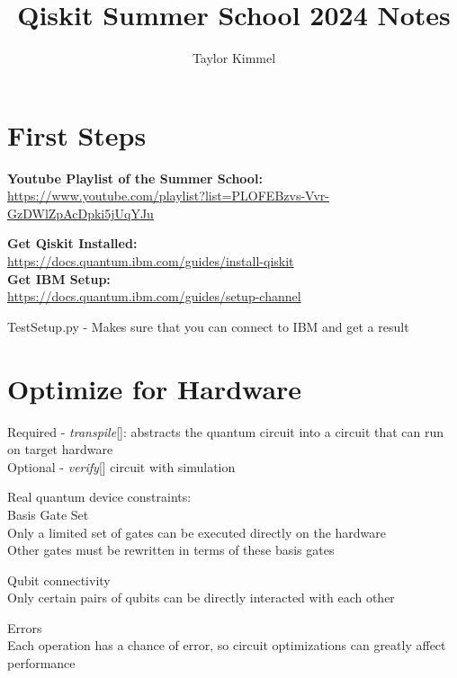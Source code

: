 \documentclass{article}
\title{Qiskit Summer School 2024 Notes}
\author{Taylor Kimmel}
\newcommand{\ms}{\medskip}
\newlength{\tindent}
\renewcommand{\indent}{\hspace*{\tindent}}
\begin{document}
\maketitle
\tableofcontents


\section*{First Steps}
\label{s:firstSteps}

\textbf{Youtube Playlist of the Summer School:}\\
\url{https://www.youtube.com/playlist?list=PLOFEBzvs-Vvr-GzDWlZpAcDpki5jUqYJu}\ms

\textbf{Get Qiskit Installed:}\\
\url{https://docs.quantum.ibm.com/guides/install-qiskit}\\
\textbf{Get IBM Setup:}\\
\url{https://docs.quantum.ibm.com/guides/setup-channel}\ms

TestSetup.py - Makes sure that you can connect to IBM and get a result

\section*{Optimize for Hardware}
\label{s:optimize}

Required - \textit{transpile}[]: abstracts the quantum circuit into a circuit that can run on target hardware\\
Optional - \textit{verify}[] circuit with simulation

\ms

Real quantum device constraints:\\
Basis Gate Set\\
    \indent Only a limited set of gates can be executed directly on the hardware\\
    \indent Other gates must be rewritten in terms of these basis gates\ms

Qubit connectivity\\
    \indent Only certain pairs of qubits can be directly interacted with each other\ms

Errors\\
    \indent Each operation has a chance of error, so circuit optimizations can greatly affect performance\ms
\end{document}

